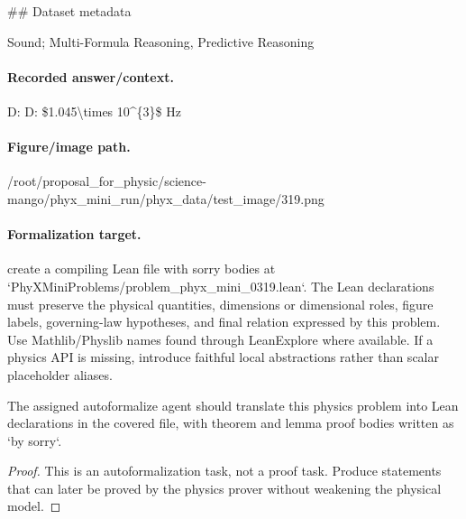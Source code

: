 \#\# Dataset metadata

Sound; Multi-Formula Reasoning, Predictive Reasoning

\paragraph{Recorded answer/context.}
D: D: \$1.045\textbackslash{}times 10\textasciicircum{}\{3\}\$ Hz

\paragraph{Figure/image path.}
/root/proposal\_for\_physic/science-mango/phyx\_mini\_run/phyx\_data/test\_image/319.png

\paragraph{Formalization target.}
create a compiling Lean file with sorry bodies at `PhyXMiniProblems/problem\_phyx\_mini\_0319.lean`. The Lean declarations must preserve the physical quantities, dimensions or dimensional roles, figure labels, governing-law hypotheses, and final relation expressed by this problem.
Use Mathlib/Physlib names found through LeanExplore where available. If a physics API is missing, introduce faithful local abstractions rather than scalar placeholder aliases.

\begin{theorem}
\label{thm:physics:phyx_mini_0319:target}
The assigned autoformalize agent should translate this physics problem into Lean declarations in the covered file, with theorem and lemma proof bodies written as `by sorry`.
\end{theorem}
\begin{proof}
This is an autoformalization task, not a proof task. Produce statements that can later be proved by the physics prover without weakening the physical model.
\end{proof}

